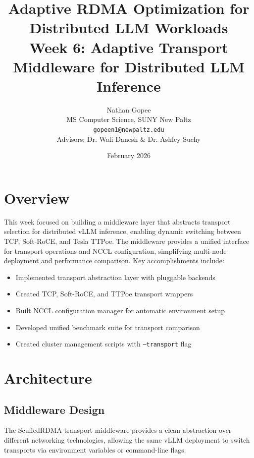 \documentclass[10pt,letterpaper]{article}
\title{\textbf{Adaptive RDMA Optimization for Distributed LLM Workloads}\\[0.5em]
\large Week 6: Adaptive Transport Middleware for Distributed LLM Inference}
\author{Nathan Gopee\\
MS Computer Science, SUNY New Paltz\\
\texttt{gopeen1@newpaltz.edu}\\[1em]
\small Advisors: Dr. Wafi Danesh \& Dr. Ashley Suchy}
\date{February 2026}
\begin{document}
\maketitle

\section{Overview}

This week focused on building a middleware layer that abstracts transport selection for distributed vLLM inference, enabling dynamic switching between TCP, Soft-RoCE, and Tesla TTPoe. The middleware provides a unified interface for transport operations and NCCL configuration, simplifying multi-node deployment and performance comparison. Key accomplishments include:

\begin{itemize}[noitemsep]
    \item Implemented transport abstraction layer with pluggable backends
    \item Created TCP, Soft-RoCE, and TTPoe transport wrappers
    \item Built NCCL configuration manager for automatic environment setup
    \item Developed unified benchmark suite for transport comparison
    \item Created cluster management scripts with \texttt{--transport} flag
\end{itemize}

\section{Architecture}

\subsection{Middleware Design}

The ScuffedRDMA transport middleware provides a clean abstraction over different networking technologies, allowing the same vLLM deployment to switch transports via environment variables or command-line flags.
\end{document}

